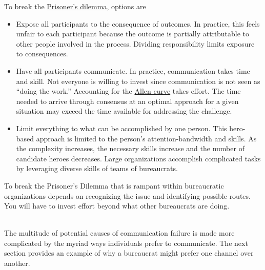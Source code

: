 To break the 
\href{https://en.wikipedia.org/wiki/Prisoner\%27s\_dilemma}{Prisoner's dilemma}, 
\iftoggle{WPinmargin}{\marginpar{[Wikipedia] Prisoner's\\dilemma}}{}
options are 
\begin{itemize}
    \item Expose all participants to the consequence of outcomes. In practice, this feels unfair to each participant because the outcome is partially attributable to other people involved in the process. Dividing responsibility limits exposure to consequences.
    \item Have all participants communicate. In practice, communication takes time and skill. Not everyone is willing to invest since communication is not seen as ``doing the work.'' Accounting for the \href{https://en.wikipedia.org/wiki/Allen\_curve}{Allen curve}
    \iftoggle{WPinmargin}{\marginpar{[Wikipedia] Allen\\curve}}{}
    takes effort. The time needed to arrive through consensus at an optimal approach for a given situation may exceed the time available for addressing the challenge.
    \item Limit everything to what can be accomplished by one person. This hero-based approach is limited to the person's attention-bandwidth and skills. As the complexity increases, the necessary skills increase and the number of candidate heroes decreases. Large organizations accomplish complicated tasks by leveraging diverse skills of teams of bureaucrats.
\end{itemize}
To break the Prisoner's Dilemma that is rampant within bureaucratic organizations depends on recognizing the issue and identifying possible routes. You will have to invest effort beyond what other bureaucrats are doing.



\ \\


The multitude of potential causes of communication failure is made more complicated by the myriad ways individuals prefer to communicate. The next section provides an example of why a bureaucrat might prefer one channel over another. 
 
 